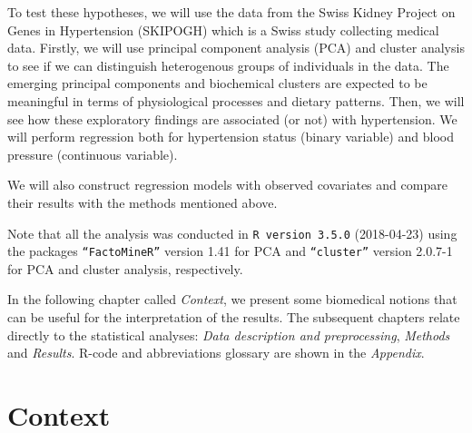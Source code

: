 To test these hypotheses, we will use the data from the Swiss Kidney Project on Genes in Hypertension (SKIPOGH) which is a Swiss study collecting medical data. Firstly, we will use principal component analysis (PCA) and cluster analysis to see if we can distinguish heterogenous groups of individuals in the data. The emerging principal components and biochemical clusters are expected to be meaningful in terms of physiological processes and dietary patterns. Then, we will see how these exploratory findings are associated (or not) with hypertension. We will perform regression both for hypertension status (binary variable) and blood pressure (continuous variable). 

We will also construct regression models with observed covariates and compare their results with the methods mentioned above.

Note that all the analysis was conducted in \texttt{R version 3.5.0} (2018-04-23) using the packages \texttt{``FactoMineR''} version 1.41 for PCA and \texttt{``cluster''} version 2.0.7-1 for PCA and cluster analysis, respectively.

In the following chapter called \emph{Context}, we present some biomedical notions that can be useful for the interpretation of the results. The subsequent chapters relate directly to the statistical analyses: \emph{Data description and preprocessing}, \emph{Methods} and \emph{Results}. R-code and abbreviations glossary are shown in the \emph{Appendix}.


\chapter{Context}
\label{ch:Context}

